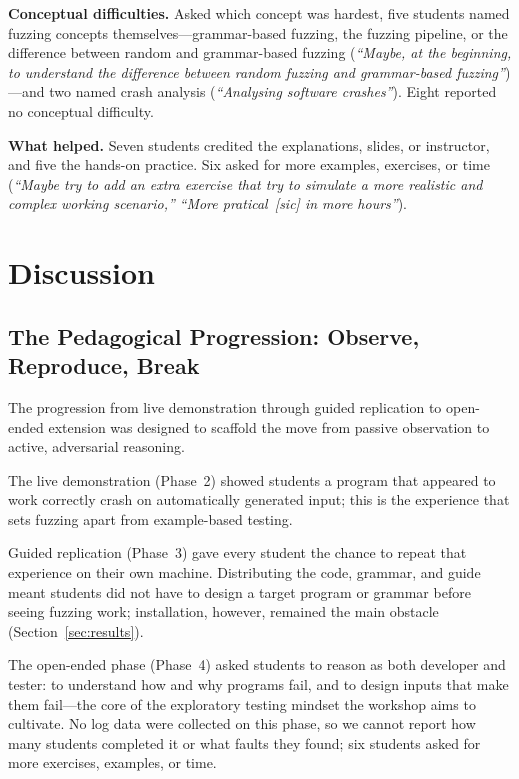 \documentclass[conference]{IEEEtran}
\begin{document}
\textbf{Conceptual difficulties.}
Asked which concept was hardest, five students named fuzzing concepts themselves---grammar-based fuzzing, the fuzzing pipeline, or the difference between random and grammar-based fuzzing (\emph{``Maybe, at the beginning, to understand the difference between random fuzzing and grammar-based fuzzing''})---and two named crash analysis (\emph{``Analysing software crashes''}).
Eight reported no conceptual difficulty.

\textbf{What helped.}
Seven students credited the explanations, slides, or instructor, and five the hands-on practice.
Six asked for more examples, exercises, or time (\emph{``Maybe try to add an extra exercise that try to simulate a more realistic and complex working scenario,''} \emph{``More pratical~[sic] in more hours''}).

\section{Discussion}
\label{sec:discussion}

\subsection{The Pedagogical Progression: Observe, Reproduce, Break}

The progression from live demonstration through guided replication to open-ended extension was designed to scaffold the move from passive observation to active, adversarial reasoning.

The live demonstration (Phase~2) showed students a program that appeared to work correctly crash on automatically generated input; this is the experience that sets fuzzing apart from example-based testing.

Guided replication (Phase~3) gave every student the chance to repeat that experience on their own machine.
Distributing the code, grammar, and guide meant students did not have to design a target program or grammar before seeing fuzzing work; installation, however, remained the main obstacle (Section~\ref{sec:results}).

The open-ended phase (Phase~4) asked students to reason as both developer and tester: to understand how and why programs fail, and to design inputs that make them fail---the core of the exploratory testing mindset the workshop aims to cultivate.
No log data were collected on this phase, so we cannot report how many students completed it or what faults they found; six students asked for more exercises, examples, or time.
\end{document}
